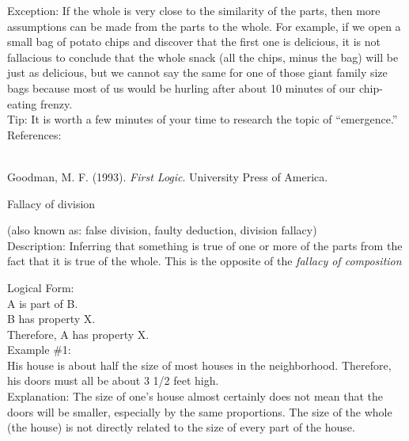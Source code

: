 \documentclass[a4paper,12pt,single,pdftex]{scrartcl}
\begin{document}
    
      Exception: If the whole is very close to the similarity of the parts, then more assumptions can be made from the parts to the whole.  For example, if we open a small bag of potato chips and discover that the first one is delicious, it is not fallacious to conclude that the whole snack (all the chips, minus the bag) will be just as delicious, but we cannot say the same for one of those giant family size bags because most of us would be hurling after about 10 minutes of our chip-eating frenzy.
    \\

    
      Tip: It is worth a few minutes of your time to research the topic of “emergence.” 
    \\

    References:

    
      
        
      \\

      
        
          Goodman, M. F. (1993). {\it First Logic}. University Press of America.
        
      
    
  

Fallacy of division
    
      (also known as: false division, faulty deduction, division fallacy)
    \\

  
    Description: Inferring that something is true of one or more of the parts from the fact that it is true of the whole.  This is the opposite of the {\it fallacy of composition} 

    
      Logical Form:
    \\

    
      A is part of B.
    \\

    
      B has property X.
    \\

    
      Therefore, A has property X.
    \\

    
      Example \#1:
    \\

    
      His house is about half the size of most houses in the neighborhood. Therefore, his doors must all be about 3 1/2 feet high.
    \\

    
      Explanation: The size of one’s house almost certainly does not mean that the doors will be smaller, especially by the same proportions.  The size of the whole (the house) is not directly related to the size of every part of the house.
    \\
\end{document}
